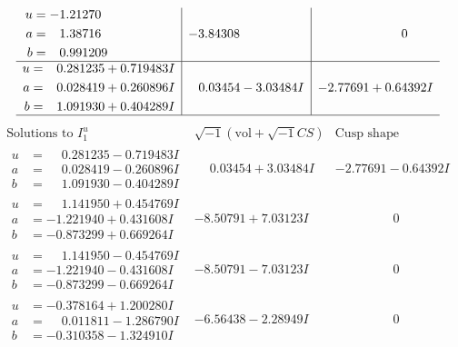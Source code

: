 \documentclass[1p]{elsarticle_modified}
\theoremstyle{definition}
\newcommand{\I}{\sqrt{-1}}
\begin{document}
$$\begin{array}{c|c|c}
\begin{aligned}
u &= -1.21270\phantom{ +0.000000I} \\
a &= \phantom{-}1.38716\phantom{ +0.000000I} \\
b &= \phantom{-}0.991209\phantom{ +0.000000I}\end{aligned}
 & -3.84308\phantom{ +0.000000I} & \phantom{-0.000000 } 0 \\ \hline\begin{aligned}
u &= \phantom{-}0.281235 + 0.719483 I \\
a &= \phantom{-}0.028419 + 0.260896 I \\
b &= \phantom{-}1.091930 + 0.404289 I\end{aligned}
 & \phantom{-}0.03454 - 3.03484 I & -2.77691 + 0.64392 I\\
 \hline 
 \end{array}$$\newpage$$\begin{array}{c|c|c}  
\text{Solutions to }I^u_{1}& \I (\text{vol} + \sqrt{-1}CS) & \text{Cusp shape}\\
 \hline 
\begin{aligned}
u &= \phantom{-}0.281235 - 0.719483 I \\
a &= \phantom{-}0.028419 - 0.260896 I \\
b &= \phantom{-}1.091930 - 0.404289 I\end{aligned}
 & \phantom{-}0.03454 + 3.03484 I & -2.77691 - 0.64392 I \\ \hline\begin{aligned}
u &= \phantom{-}1.141950 + 0.454769 I \\
a &= -1.221940 + 0.431608 I \\
b &= -0.873299 + 0.669264 I\end{aligned}
 & -8.50791 + 7.03123 I & \phantom{-0.000000 } 0 \\ \hline\begin{aligned}
u &= \phantom{-}1.141950 - 0.454769 I \\
a &= -1.221940 - 0.431608 I \\
b &= -0.873299 - 0.669264 I\end{aligned}
 & -8.50791 - 7.03123 I & \phantom{-0.000000 } 0 \\ \hline\begin{aligned}
u &= -0.378164 + 1.200280 I \\
a &= \phantom{-}0.011811 - 1.286790 I \\
b &= -0.310358 - 1.324910 I\end{aligned}
 & -6.56438 - 2.28949 I & \phantom{-0.000000 } 0 \\ \hline\begin{aligned}

\end{aligned}
\end{array}$$
\end{document}
